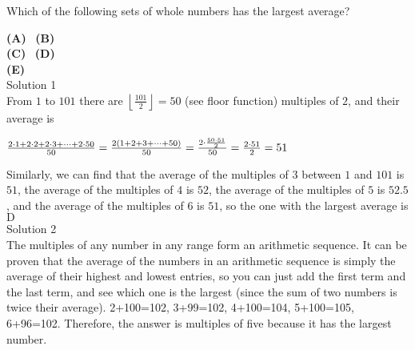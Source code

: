 

Which of the following sets of whole numbers has the largest average?

\textbf{(A)}\  \qquad
\textbf{(B)}\  \\
\textbf{(C)}\  \qquad
\textbf{(D)}\  \\
\textbf{(E)}\ 
\\
Solution 1
\\
From $1$ to $101$ there are $\left\lfloor \frac{101}{2} \right\rfloor = 50$ (see floor function) multiples of $2$, and their average is

$\frac{2\cdot 1+2\cdot 2+2\cdot 3+\cdots + 2\cdot 50}{50}  \\ \\ = \frac{2(1+2+3+\cdots +50)}{50}  \\ \\ = \frac{2\cdot \frac{50\cdot 51}{2}}{50} \\ \\ = \frac{2\cdot 51}{2} \\ \\ = 51$

Similarly, we can find that the average of the multiples of $3$ between $1$ and $101$ is $51$, the average of the multiples of $4$ is $52$, the average of the multiples of $5$ is $52.5$, and the average of the multiples of $6$ is $51$, so the one with the largest average is $\boxed{\text{D}}$
\\
Solution 2
\\
The multiples of any number in any range form an arithmetic sequence. It can be proven that the average of the numbers in an arithmetic sequence is simply the average of their highest and lowest entries, so you can just add the first term and the last term, and see which one is the largest (since the sum of two numbers is twice their average). 2+100=102, 3+99=102, 4+100=104, 5+100=105, 6+96=102. Therefore, the answer is multiples of five because it has the largest number.
